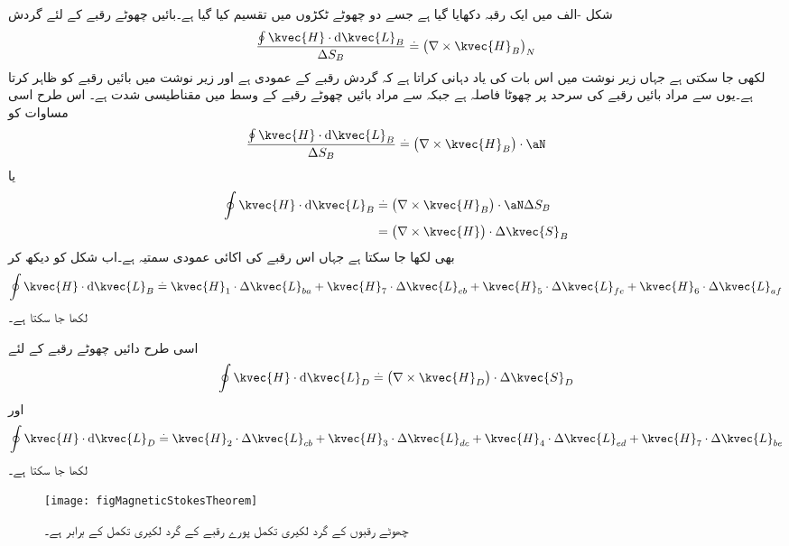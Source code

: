 شکل -الف میں ایک رقبہ دکھایا گیا ہے جسے دو چھوٹے ٹکڑوں میں تقسیم کیا گیا ہے۔بائیں چھوٹے رقبے کے لئے گردش
\begin{align*}
\frac{\oint \kvec{H} \cdot \dif \kvec{L}_B}{\Delta S_B} \overset{.}{=} \left(\nabla \times \kvec{H}_B \right)_N
\end{align*}
لکھی جا سکتی ہے جہاں زیر نوشت میں  اس بات کی یاد دہانی کراتا ہے کہ گردش رقبے  کے عمودی ہے اور زیر نوشت میں  بائیں رقبے کو ظاہر کرتا ہے۔یوں  سے مراد بائیں رقبے کی       سرحد پر چھوٹا فاصلہ ہے جبکہ  سے مراد بائیں چھوٹے رقبے کے وسط میں مقناطیسی شدت ہے۔ اس طرح اسی مساوات  کو
\begin{align*}
\frac{\oint \kvec{H} \cdot \dif \kvec{L}_B}{\Delta S_B} \overset{.}{=} \left(\nabla \times \kvec{H}_B \right) \cdot \aN
\end{align*}
یا
\begin{align*}
\oint \kvec{H} \cdot \dif \kvec{L}_B &\overset{.}{=} \left(\nabla \times \kvec{H}_B \right) \cdot \aN \Delta S_B \\
&=\left(\nabla \times \kvec{H} \right) \cdot  \Delta \kvec{S}_B
\end{align*}
بھی لکھا جا سکتا ہے جہاں  اس رقبے کی اکائی عمودی سمتیہ ہے۔اب شکل کو دیکھ کر
\begin{align*}
\oint \kvec{H} \cdot \dif \kvec{L}_B\overset{.}{=} \kvec{H}_1 \cdot \Delta \kvec{L}_{ba}+ \kvec{H}_7 \cdot \Delta\kvec{L}_{eb}+ \kvec{H}_5 \cdot \Delta \kvec{L}_{fe}+ \kvec{H}_6 \cdot \Delta \kvec{L}_{af}
\end{align*}
لکھا جا سکتا ہے۔ 

اسی طرح دائیں چھوٹے رقبے کے لئے
\begin{align*}
\oint \kvec{H} \cdot \dif \kvec{L}_D\overset{.}{=}\left(\nabla \times \kvec{H}_D \right) \cdot  \Delta \kvec{S}_D
\end{align*}
اور
\begin{align*}
\oint \kvec{H} \cdot \dif \kvec{L}_D\overset{.}{=} \kvec{H}_2 \cdot \Delta\kvec{L}_{cb}+ \kvec{H}_3 \cdot \Delta\kvec{L}_{dc}+ \kvec{H}_4 \cdot \Delta\kvec{L}_{ed}+ \kvec{H}_7 \cdot \Delta\kvec{L}_{be}
\end{align*}
لکھا جا سکتا ہے۔

\begin{figure}
\centering
\texttt{[image: figMagneticStokesTheorem]}
\caption{چھوٹے رقبوں کے گرد لکیری تکمل پورے رقبے کے گرد لکیری تکمل کے برابر ہے۔}
\label{شکل_مقناطیسی_مسئلہ_سٹوکس}
\end{figure}

